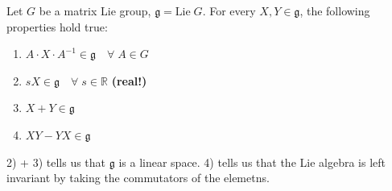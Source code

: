 \documentclass[../main.tex]{subfiles}
\begin{document}
\begin{proposition}
Let $G$ be a matrix Lie group, $\mathfrak{g}=\textrm{Lie}\;G$. For every $X,Y\in\mathfrak{g}$, the following properties hold true:
\renewcommand{\labelenumi}{\arabic{enumi})}
\begin{enumerate}
    \item $A\cdot X\cdot A^{-1}\in\mathfrak{g}\quad\forall\;A\in G$
    \item $sX\in\mathfrak{g}\quad \forall\;s\in\mathbb{R}$ \textbf{(real!)}
    \item $X+Y\in\mathfrak{g}$
    \item $XY-YX\in \mathfrak{g}$
\end{enumerate}
2) + 3) tells us that $\mathfrak{g}$ is a linear space. 4) tells us that the Lie algebra is left invariant by taking the commutators of the elemetns.
\end{proposition}
\end{document}

